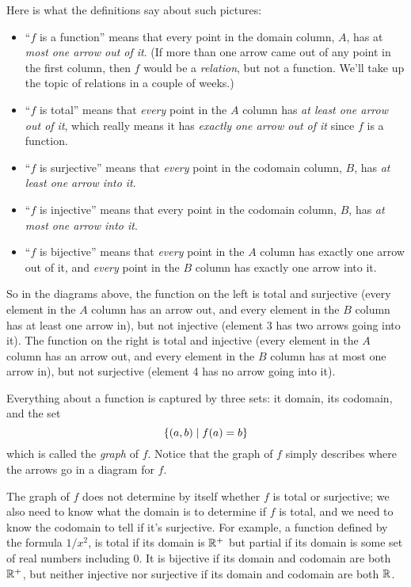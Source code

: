 Here is what the definitions say about such pictures:
\begin{itemize}

\item ``$f$ is a function'' means that every point in the domain column,
  $A$, has at \emph{most one arrow out of it}.  (If more than one arrow
  came out of any point in the first column, then $f$ would be a
  \emph{relation}, but not a function.  We'll take up the topic of
  relations in a couple of weeks.)

\item ``$f$ is total'' means that \emph{every} point in the $A$ column has
  \emph{at least one arrow out of it}, which really means it has
  \emph{exactly one arrow out of it} since $f$ is a function.

\item ``$f$ is surjective'' means that \emph{every} point in the codomain
  column, $B$, has \emph{at least one arrow into it}.

\item ``$f$ is injective'' means that every point in the codomain column,
  $B$, has \emph{at most one arrow into it}.

\item ``$f$ is bijective'' means that \emph{every} point in the $A$ column
      has exactly one arrow out of it, and \emph{every} point in the $B$ column
      has exactly one arrow into it.

\end{itemize}

So in the diagrams above, the function on the left is total and surjective
(every element in the $A$ column has an arrow out, and every element in
the $B$ column has at least one arrow in), but not injective (element 3
has two arrows going into it).  The function on the right is total and
injective (every element in the $A$ column has an arrow out, and every
element in the $B$ column has at most one arrow in), but not surjective
(element 4 has no arrow going into it).

Everything about a function is captured by three sets: it domain, its
codomain, and the set
\[
\left\{(a,b) \mid f(a) = b\right\}
\]
which is called the \emph{graph} of $f$.  Notice that the graph of $f$
simply describes where the arrows go in a diagram for $f$.

The graph of $f$ does not determine by itself whether $f$ is total or
surjective; we also need to know what the domain is to determine if $f$ is
total, and we need to know the codomain to tell if it's surjective.  For
example, a function defined by the formula $1/x^2$, is
total if its domain is $\mathbb{R}^+$ but partial if its domain is some set of
real numbers including 0.  It is bijective if its domain and codomain are
both $\mathbb{R}^+$, but neither injective nor surjective if its domain and
codomain are both $\mathbb{R}$.

